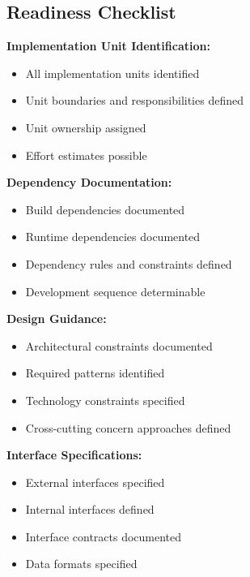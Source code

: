 \documentclass[11pt]{article}
\begin{document}
\subsection{Readiness Checklist}

\begin{checklistbox}

\textbf{Implementation Unit Identification:}
\begin{itemize}[leftmargin=1.5cm]
    \item[$\square$] All implementation units identified
    \item[$\square$] Unit boundaries and responsibilities defined
    \item[$\square$] Unit ownership assigned
    \item[$\square$] Effort estimates possible
\end{itemize}

\textbf{Dependency Documentation:}
\begin{itemize}[leftmargin=1.5cm]
    \item[$\square$] Build dependencies documented
    \item[$\square$] Runtime dependencies documented
    \item[$\square$] Dependency rules and constraints defined
    \item[$\square$] Development sequence determinable
\end{itemize}

\textbf{Design Guidance:}
\begin{itemize}[leftmargin=1.5cm]
    \item[$\square$] Architectural constraints documented
    \item[$\square$] Required patterns identified
    \item[$\square$] Technology constraints specified
    \item[$\square$] Cross-cutting concern approaches defined
\end{itemize}

\textbf{Interface Specifications:}
\begin{itemize}[leftmargin=1.5cm]
    \item[$\square$] External interfaces specified
    \item[$\square$] Internal interfaces defined
    \item[$\square$] Interface contracts documented
    \item[$\square$] Data formats specified
\end{itemize}


\end{checklistbox}
\end{document}
